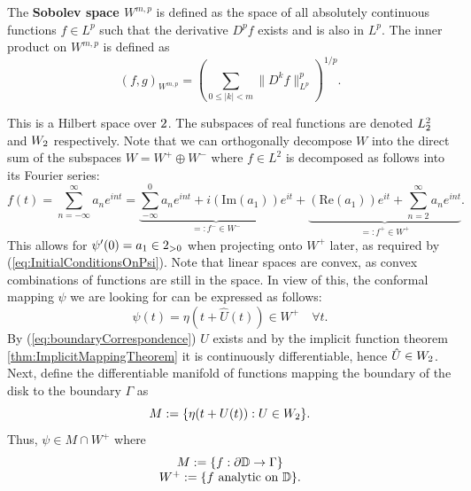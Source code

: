 \begin{definition}
    The \textbf{Sobolev space $W^{m,p}$} is defined as the space of all absolutely continuous functions $f\in L^p$ such that the derivative $D^pf$ exists and is also in $L^p$. The inner product on $W^{m,p}$ is defined as
    $$(f,g)_{W^{m,p}} = \left (\sum_{0 \leq |k| < m} \lVert D^kf\rVert_{L^p}^p \right )^{1/p}.$$
\end{definition}
This is a Hilbert space over $2$. The subspaces of real functions are denoted $L_{2}^2$ and $W_{2}$ respectively. Note that we can orthogonally decompose $W$ into the direct sum of the subspaces $W = W^{+} \oplus W^{-}$ \cite{Wegmann1989_alternating_projections} where $f \in L^2$ is decomposed as follows into its Fourier series:
$$f(t) =  \sum_{n = -\infty}^{\infty} a_n e^{int} = 
    \underbrace{\sum_{-\infty}^{0} a_n e^{int} +i(\text{Im}(a_1))e^{it}}_{=:f^{-}\in W^{-}} + 
    \underbrace{(\text{Re}(a_1))e^{it} + \sum_{n=2}^{\infty} a_n e^{int}}_{=:f^{+}\in W^{+}}.
$$
This allows for $\psi'(0)=a_1 \in 2_{>0}$ when projecting onto $W^+$ later, as required by (\ref{eq:InitialConditionsOnPsi}).
Note that linear spaces are convex, as convex combinations of functions are still in the space.
In view of this, the conformal mapping $\psi$ we are looking for can be expressed as follows:
\begin{equation}
    \psi(t)=\eta(t+\hat{U}(t))\in W^{+}  \quad \forall t.
\end{equation}
By (\ref{eq:boundaryCorrespondence}) $\hat{U}$ exists and by the implicit function theorem \ref{thm:ImplicitMappingTheorem} it is continuously differentiable, hence $\hat{U} \in W_{2}$.
Next, define the differentiable manifold of functions mapping the boundary of the disk to the boundary $\Gamma$ as
\begin{equation}
    M:= \{\eta(t+U(t)) : U \in W_{2}\}.
\end{equation}
Thus, $\psi\in M\cap W^+$ where
\begin{equation}
    \begin{matrix}
        M := \{f:\partial\mathbb{D}\to\Gamma\} \\
        W^+ := \{f \text{ analytic on }\mathbb{D} \}.
    \end{matrix}
\end{equation}

